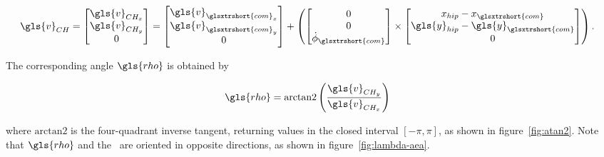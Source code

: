     \begin{align}
        \gls{v}_{CH} &= 
            \begin{bmatrix}
                \gls{v}_{CH_x}  \\
                \gls{v}_{CH_y}  \\
                0 \\
            \end{bmatrix} = 
            \begin{bmatrix}
                \gls{v}_{\glsxtrshort{com}_x}  \\
                \gls{v}_{\glsxtrshort{com}_y}  \\
                0 \\
            \end{bmatrix} + \left(
            \begin{bmatrix}
                0   \\
                0   \\
                \dot{\phi}_{\glsxtrshort{com}} \\
            \end{bmatrix} \times
            \begin{bmatrix}
               x_{hip} - x_{\glsxtrshort{com}}   \\
               \gls{y}_{hip} - \gls{y}_{\glsxtrshort{com}}   \\
               0         \\
            \end{bmatrix}
            \right).
    \end{align}
    
    The corresponding angle$~\gls{rho}$ is obtained by

    \begin{align}
        \gls{rho} &= \textrm{arctan2}\left( \frac{\gls{v}_{CH_y}}{\gls{v}_{CH_x}} \right)
    \end{align}

    where $\textrm{arctan2}$ is the four-quadrant inverse tangent, returning values in the closed interval $\left[-\pi, \pi\right]$, as shown in figure~\ref{fig:atan2}. Note that$~\gls{rho}$ and the~ are oriented in opposite directions, as shown in figure~\ref{fig:lambda-aea}. \\

